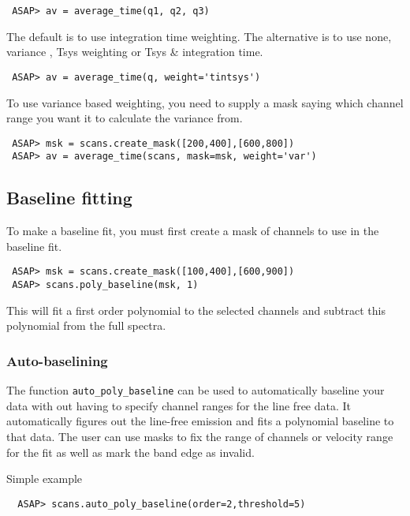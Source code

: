 \documentclass[11pt]{article}
\newcommand{\cmd}[1]{{\tt #1}}
\begin{document}
\begin{verbatim}
 ASAP> av = average_time(q1, q2, q3)
\end{verbatim}

The default is to use integration time weighting. The alternative is
to use none, variance , Tsys weighting or Tsys \& integration time.

\begin{verbatim}
 ASAP> av = average_time(q, weight='tintsys')
\end{verbatim}

To use variance based weighting, you need to supply a mask saying which
channel range you want it to calculate the variance from.

\begin{verbatim}
 ASAP> msk = scans.create_mask([200,400],[600,800])
 ASAP> av = average_time(scans, mask=msk, weight='var')
\end{verbatim}

\subsection{Baseline fitting}

To make a baseline fit, you must first create a mask of channels to
use in the baseline fit. 

\begin{verbatim}
 ASAP> msk = scans.create_mask([100,400],[600,900])
 ASAP> scans.poly_baseline(msk, 1) 
\end{verbatim}

This will fit a first order polynomial to the selected channels and subtract
this polynomial from the full spectra.

\subsubsection{Auto-baselining}

The function \cmd{auto\_poly\_baseline} can be used to automatically
baseline your data with out having to specify channel ranges for
the line free data. It automatically figures out the line-free
emission and fits a polynomial baseline to that data. The user can use
masks to fix the range of channels or velocity range for the fit as
well as mark the band edge as invalid. 

Simple example

\begin{verbatim}
  ASAP> scans.auto_poly_baseline(order=2,threshold=5)
\end{verbatim}
\end{document}
